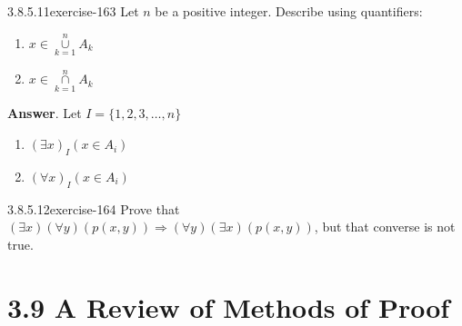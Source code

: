 \documentclass[twoside,10pt,]{book}
\numberwithin{equation}{section}
\begin{document}
\begin{divisionsolution}{3.8.5.11}{}{exercise-163}%
\hypertarget{p-1452}{}%
Let \(n\) be a positive integer.  Describe using quantifiers:%
\par
\hypertarget{p-1453}{}%
\leavevmode%
\begin{enumerate}[label=(\alph*)]
\item\hypertarget{li-799}{}\hypertarget{p-1454}{}%
\(x \in \underset{k=1}{\overset{n}{\cup }}A_k\)%
\item\hypertarget{li-800}{}\hypertarget{p-1455}{}%
\(x \in \underset{k=1}{\overset{n}{\cap }}A_k\)%
\end{enumerate}
%
\par\smallskip%
\noindent\textbf{Answer}.\quad%
\hypertarget{p-1456}{}%
Let \(I=\{1,2,3,\ldots ,n\}\)%
\par
\hypertarget{p-1457}{}%
\leavevmode%
\begin{enumerate}[label=(\alph*)]
\item\hypertarget{li-801}{}\hypertarget{p-1458}{}%
\((\exists x)_I\left(x\in A_i\right)\)%
\item\hypertarget{li-802}{}\hypertarget{p-1459}{}%
\((\forall x)_I\left(x\in A_i\right)\)%
\end{enumerate}
%
\end{divisionsolution}%
\begin{divisionsolution}{3.8.5.12}{}{exercise-164}%
\hypertarget{p-1460}{}%
Prove that \((\exists x)(\forall y)(p(x, y)) \Rightarrow  (\forall y)(\exists x)(p(x, y))\), but that converse is not true.%
\end{divisionsolution}%
\section*{3.9 A Review of Methods of Proof}
\end{document}

